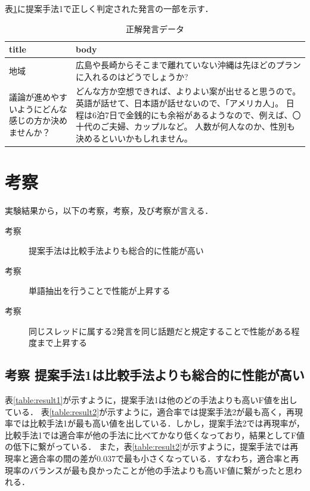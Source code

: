 表\ref{table:HitsRemark}に提案手法1で正しく判定された発言の一部を示す．
\begin{table}[htbp]
  \begin{tabular}{| p{4cm} | p{11cm} |} \hline
     title & body\\ \hline
     地域&広島や長崎からそこまで離れていない沖縄は先ほどのプランに入れるのはどうでしょうか?\\ \hline
     議論が進めやすいようにどんな感じの方か決めませんか？ &どんな方か空想できれば、よりよい案が出せると思うので。
英語が話せて、日本語が話せないので、「アメリカ人」。
 日程は6泊7日で金銭的にも余裕があるようなので、例えば、〇十代のご夫婦、カップルなど。 人数が何人なのか、性別も決めるといいかもしれません。
\\\hline
  \end{tabular}
  \caption{正解発言データ} \label{table:HitsRemark}
\end{table}


\section{考察}
\label{exp:consideration}
実験結果から，以下の考察，考察，及び考察が言える．\\
\begin{description} 
  \item[考察] 提案手法は比較手法よりも総合的に性能が高い
  \item[考察] 単語抽出を行うことで性能が上昇する
  \item[{考察}] 同じスレッドに属する2発言を同じ話題だと規定することで性能がある程度まで上昇する
\end{description}
\subsection*{考察 提案手法1は比較手法よりも総合的に性能が高い}
表\ref{table:result1}が示すように，提案手法1は他のどの手法よりも高いF値を出している．
表\ref{table:result2}が示すように，適合率では提案手法2が最も高く，再現率では比較手法1が最も高い値を出している．しかし，提案手法2では再現率が，比較手法1では適合率が他の手法に比べてかなり低くなっており，結果としてF値の低下に繋がっている．
また，表\ref{table:result2}が示すように，提案手法では再現率と適合率の間の差が$0.037$で最も小さくなっている．すなわち，適合率と再現率のバランスが最も良かったことが他の手法よりも高いF値に繋がったと思われる．

